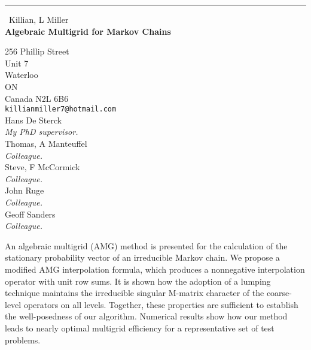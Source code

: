 \documentclass{report}
\begin{document}
\begin{center}
\rule{6in}{1pt} \
{\large Killian, L Miller \\
{\bf Algebraic Multigrid for Markov Chains}}

256 Phillip Street \\ Unit 7 \\ Waterloo \\ ON \\ Canada N2L 6B6
\\
{\tt killianmiller7@hotmail.com}\\
Hans De Sterck\\
{\em My PhD supervisor.}\\
Thomas, A Manteuffel\\
{\em Colleague.}\\
Steve, F McCormick\\
{\em Colleague.}\\
John Ruge\\
{\em Colleague.}\\
Geoff Sanders\\
{\em Colleague.}\end{center}

An algebraic multigrid (AMG) method is presented for the calculation of
the stationary probability vector of an irreducible Markov chain. We
propose a modified AMG interpolation formula, which produces a
nonnegative interpolation operator with unit row sums. It is shown how
the adoption of a lumping technique maintains the irreducible singular
M-matrix character of the coarse-level operators on all levels. Together,
these properties are sufficient to establish the well-posedness of our
algorithm. Numerical results show how our method leads to nearly optimal
multigrid efficiency for a representative set of test problems.
\end{document}
